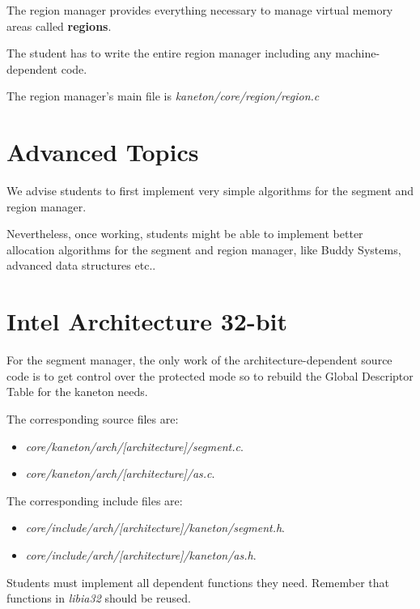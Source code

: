 The region manager provides everything necessary to manage virtual
memory areas called \textbf{regions}.

The student has to write the entire region manager including any
machine-dependent code.

The region manager's main file is \textit{kaneton/core/region/region.c}

%
%

\section{Advanced Topics}

We advise students to first implement very simple algorithms for the segment
and region manager.

Nevertheless, once working, students might be able to implement better
allocation algorithms for the segment and region manager, like Buddy Systems,
advanced data structures etc..

%
%

\section{Intel Architecture 32-bit}

For the segment manager, the only work of the architecture-dependent source
code is to get control over the protected mode so to rebuild the Global
Descriptor Table for the kaneton needs.

The corresponding source files are:

\begin{itemize}
  \item
    \textit{core/kaneton/arch/[architecture]/segment.c}.
  \item
    \textit{core/kaneton/arch/[architecture]/as.c}.
\end{itemize}

The corresponding include files are:

\begin{itemize}
  \item
    \textit{core/include/arch/[architecture]/kaneton/segment.h}.
  \item
    \textit{core/include/arch/[architecture]/kaneton/as.h}.
\end{itemize}

Students must implement all dependent functions they need. Remember that
functions in \textit{libia32} should be reused.

